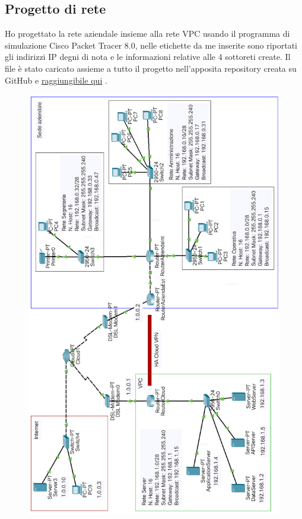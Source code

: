 \subsection{Progetto di rete} 
Ho progettato la rete aziendale insieme alla rete VPC usando il programma di simulazione Cisco Packet Tracer 8.0, nelle etichette da me inserite sono riportati gli indirizzi IP degni di nota e le informazioni relative alle 4 sottoreti create. Il file è stato caricato assieme a tutto il progetto nell'apposita repository creata su GitHub e \href{https://github.com/MauroPello/elaborato}{raggiungibile qui} \cite{GitHub}. 
\begin{figure}[ht]
    \centering\includegraphics[scale=.5]{images/rete.png}
\end{figure}